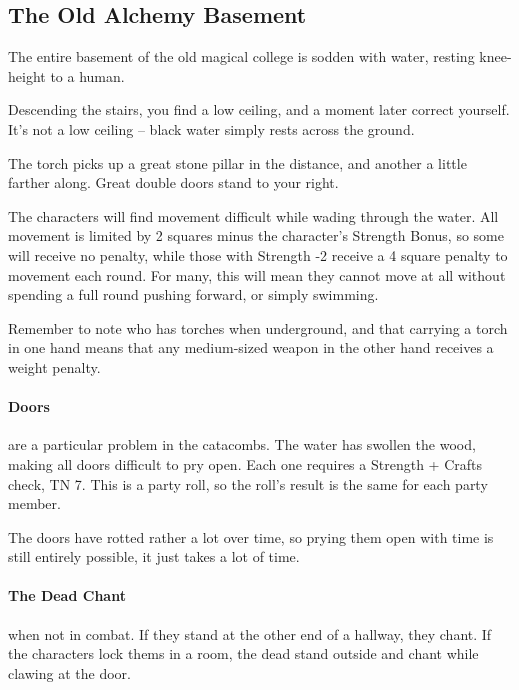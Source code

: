 \begin{multicols}{2}
\subsection{The Old Alchemy Basement}\label{old_alchemy_basement}\setcounter{list}{0}

The entire basement of the old magical college is sodden with water, resting knee-height to a human.

\begin{boxtext}
	Descending the stairs, you find a low ceiling, and a moment later correct yourself.  It's not a low ceiling -- black water simply rests across the ground.

	The torch picks up a great stone pillar in the distance, and another a little farther along.  Great double doors stand to your right.

\end{boxtext}

The characters will find movement difficult while wading through the water.  All movement is limited by 2 squares minus the character's Strength Bonus, so some will receive no penalty, while those with Strength -2 receive a 4 square penalty to movement each round.  For many, this will mean they cannot move at all without spending a full round pushing forward, or simply swimming.

Remember to note who has torches when underground, and that carrying a torch in one hand means that any medium-sized weapon in the other hand receives a weight penalty.

\needspace{21em}

\paragraph{Doors} are a particular problem in the catacombs.  The water has swollen the wood, making all doors difficult to pry open.  Each one requires a Strength + Crafts check, TN 7.  This is a party roll, so the roll's result is the same for each party member.

The doors have rotted rather a lot over time, so prying them open with time is still entirely possible, it just takes a lot of time.

\paragraph{The Dead Chant} when not in combat.
If they stand at the other end of a hallway, they chant.
If the characters lock thems in a room, the dead stand outside and chant while clawing at the door.


\end{multicols}
